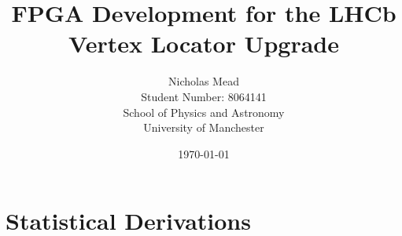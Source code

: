 \documentclass[a4paper,12pt,twoside]{article}
\title{FPGA Development for the LHCb Vertex Locator Upgrade}
\author
{
	Nicholas Mead\\
	Student Number: 8064141\\
	School of Physics and Astronomy\\
	University of Manchester
}
\date{\today}
\numberwithin{equation}{section}
\numberwithin{figure}{section}
\numberwithin{table}{section}
\let\Oldsection\section
\renewcommand{\section}{\FloatBarrier\Oldsection}
\begin{document}
	\begin{titlepage}
		\clearpage
		\maketitle \thispagestyle{empty}
		\vspace{1em}
		

		\newpage \thispagestyle{empty}
		\cleardoublepage  
		\footnotesize{\tableofcontents} 
		\thispagestyle{empty}	
	
	\end{titlepage}

	\linenumbers
	\modulolinenumbers[2]


	\setcounter{page}{1}

	

	

	

	


	

	\newpage 
	\printbibliography

	\newpage
	\appendix
	\section{Statistical Derivations}
	\label{stat_der}
	
\end{document}
